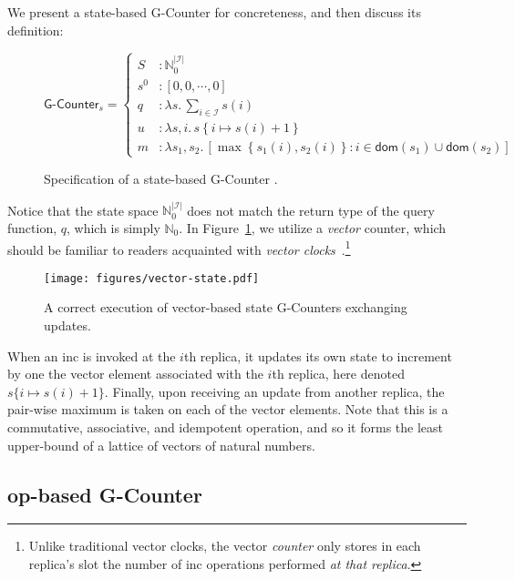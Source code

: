 We present a state-based G-Counter \CRDT for concreteness, and then discuss its
definition:

\begin{figure}[H]
  \centering
  \[
    \textsf{G-Counter}_s = \left\{\begin{aligned}
      S &: \mathbb{N}_0^{|\mathcal{I}|} \\
      s^0 &: \left[ 0, 0, \cdots, 0 \right] \\
      q &: \lambda s.\, \sum_{i \in \mathcal{I}} s(i) \\
      u &: \lambda s,i.\, s\left\{ i \mapsto s(i) + 1 \right\} \\
      m &: \lambda s_1, s_2.\, \left[ \max\left\{ s_1(i), s_2(i) \right\}: i \in \mathsf{dom}(s_1) \cup
      \mathsf{dom}(s_2) \right]
    \end{aligned}\right.
  \]
  \caption{Specification of a state-based \textsf{G-Counter} \CRDT.}
  \label{fig:state-gcounter}
\end{figure}

Notice that the state space $\mathbb{N}^{|\mathcal{I}|}_0$ does not match the
return type of the query function, $q$, which is simply $\mathbb{N}_0$. In
Figure~\ref{fig:state-gcounter}, we utilize a \emph{vector} counter, which
should be familiar to readers acquainted with \emph{vector
clocks}~\citep{lamport78}.\footnote{Unlike traditional vector clocks, the vector
\emph{counter} only stores in each replica's slot the number of \textsf{inc}
operations performed \emph{at that replica}.}

\begin{figure}[H]
  \centering
  \texttt{[image: figures/vector-state.pdf]}
    \caption{A correct execution of vector-based state G-Counters exchanging
      updates.}
\end{figure}

When an \textsf{inc} is invoked at the $i$th replica, it updates its own state
to increment by one the vector element associated with the $i$th replica, here
denoted $s\{i \mapsto s(i) + 1\}$. Finally, upon receiving an update from
another replica, the pair-wise maximum is taken on each of the vector elements.
Note that this is a commutative, associative, and idempotent operation, and so
it forms the least upper-bound of a lattice of vectors of natural numbers.

\subsection{op-based G-Counter}

